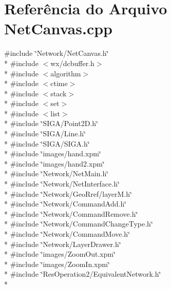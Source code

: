 \section{Referência do Arquivo Net\+Canvas.\+cpp}
\label{_net_canvas_8cpp}
{\ttfamily \#include \char`\"{}Network/\+Net\+Canvas.\+h\char`\"{}}\\*
{\ttfamily \#include $<$wx/dcbuffer.\+h$>$}\\*
{\ttfamily \#include $<$algorithm$>$}\\*
{\ttfamily \#include $<$ctime$>$}\\*
{\ttfamily \#include $<$stack$>$}\\*
{\ttfamily \#include $<$set$>$}\\*
{\ttfamily \#include $<$list$>$}\\*
{\ttfamily \#include \char`\"{}S\+I\+G\+A/\+Point2\+D.\+h\char`\"{}}\\*
{\ttfamily \#include \char`\"{}S\+I\+G\+A/\+Line.\+h\char`\"{}}\\*
{\ttfamily \#include \char`\"{}S\+I\+G\+A/\+S\+I\+G\+A.\+h\char`\"{}}\\*
{\ttfamily \#include \char`\"{}images/hand.\+xpm\char`\"{}}\\*
{\ttfamily \#include \char`\"{}images/hand2.\+xpm\char`\"{}}\\*
{\ttfamily \#include \char`\"{}Network/\+Net\+Main.\+h\char`\"{}}\\*
{\ttfamily \#include \char`\"{}Network/\+Net\+Interface.\+h\char`\"{}}\\*
{\ttfamily \#include \char`\"{}Network/\+Geo\+Rref/layer\+M.\+h\char`\"{}}\\*
{\ttfamily \#include \char`\"{}Network/\+Command\+Add.\+h\char`\"{}}\\*
{\ttfamily \#include \char`\"{}Network/\+Command\+Remove.\+h\char`\"{}}\\*
{\ttfamily \#include \char`\"{}Network/\+Command\+Change\+Type.\+h\char`\"{}}\\*
{\ttfamily \#include \char`\"{}Network/\+Command\+Move.\+h\char`\"{}}\\*
{\ttfamily \#include \char`\"{}Network/\+Layer\+Drawer.\+h\char`\"{}}\\*
{\ttfamily \#include \char`\"{}images/\+Zoom\+Out.\+xpm\char`\"{}}\\*
{\ttfamily \#include \char`\"{}images/\+Zoom\+In.\+xpm\char`\"{}}\\*
{\ttfamily \#include \char`\"{}Res\+Operation2/\+Equivalent\+Network.\+h\char`\"{}}\\*
